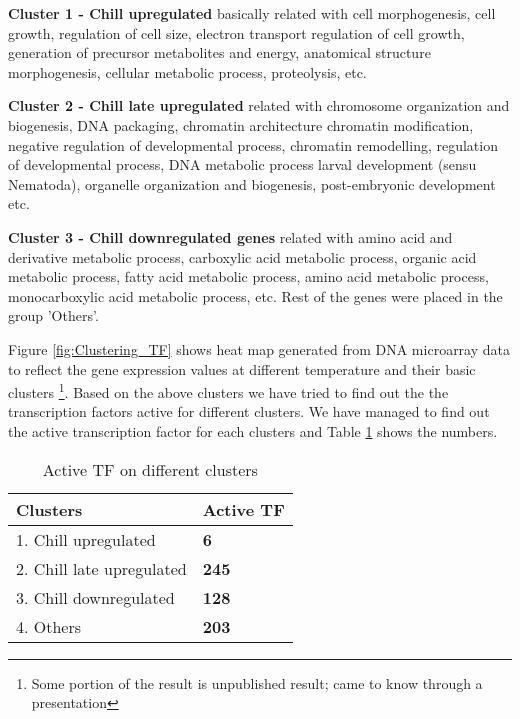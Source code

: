 \textbf{Cluster 1 - Chill upregulated} basically related with
cell morphogenesis, cell growth, regulation of cell size, electron transport
regulation of cell growth, generation of precursor metabolites and energy,
anatomical structure morphogenesis, cellular metabolic process, proteolysis,
etc.

\textbf{Cluster 2 - Chill late upregulated} related with
chromosome organization and biogenesis, DNA packaging, chromatin architecture
chromatin modification, negative regulation of developmental process, 
chromatin remodelling, regulation of developmental process, DNA metabolic process
larval development (sensu Nematoda), organelle organization and biogenesis, 
post-embryonic development etc.

\textbf{Cluster 3 - Chill downregulated genes} related with
amino acid and derivative metabolic process, carboxylic acid metabolic process,
organic acid metabolic process, fatty acid metabolic process,
amino acid metabolic process, monocarboxylic acid metabolic process, etc. 
Rest of the genes were placed in the group 'Others'.

Figure \ref{fig:Clustering_TF} shows heat map generated from DNA 
microarray data to reflect the gene expression values at
different temperature and their basic clusters \cite{Cossins:2007}\footnote{Some portion of the result
is unpublished result; came to know through a presentation}.
Based on the above clusters we have tried to find out the the transcription factors
active for different clusters. We have managed to find out the active
transcription factor for each clusters and Table \ref{table:Active_TF_diff_clusters}
shows the numbers.


\begin{table}
  \centering
  \begin{tabular}{l l }
    \toprule
    \textbf{Clusters} & \textbf{Active TF} \\
    \midrule
    1. {\color{blue}Chill upregulated} & {\color{green}\bf 6} \\ 
    2. {\color{blue}Chill late upregulated} & {\color{green}\bf245} \\ 
    3. {\color{blue}Chill downregulated} & {\color{green}\bf128} \\
    4. {\color{blue} Others} & {\color{green}\bf 203} \\
  \bottomrule
  \end{tabular}
  \caption[Active TF on different clusters]
	  {Active TF on different clusters}
  \label{table:Active_TF_diff_clusters}
\end{table}


